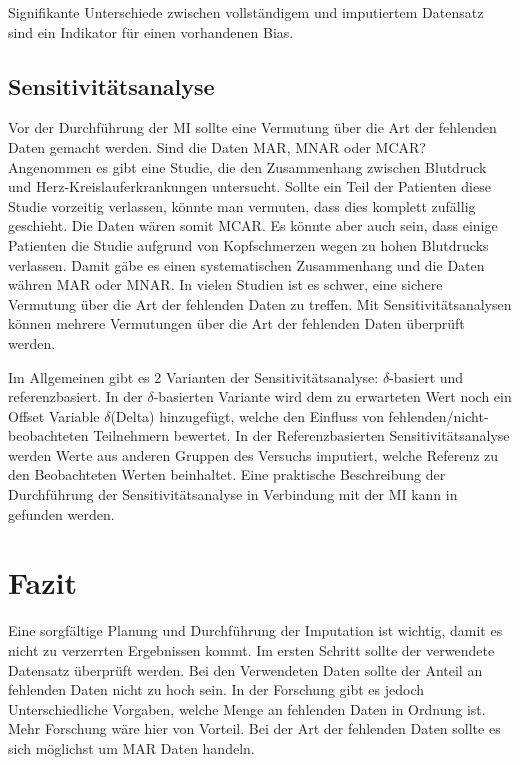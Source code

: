 Signifikante Unterschiede zwischen vollständigem und imputiertem Datensatz sind ein Indikator für einen vorhandenen Bias.

\subsection{Sensitivitätsanalyse}

Vor der Durchführung der MI sollte eine Vermutung über die Art der fehlenden Daten gemacht werden. Sind die Daten MAR, MNAR 
oder MCAR? Angenommen es gibt eine Studie, die den Zusammenhang zwischen Blutdruck und Herz-Kreislauferkrankungen untersucht. 
Sollte ein Teil der Patienten diese Studie vorzeitig verlassen, könnte man vermuten, dass dies komplett zufällig geschieht. 
Die Daten wären somit MCAR. Es könnte aber auch sein, dass einige Patienten die Studie aufgrund von Kopfschmerzen wegen zu 
hohen Blutdrucks verlassen. Damit gäbe es einen systematischen Zusammenhang und die Daten währen MAR oder MNAR. In vielen 
Studien ist es schwer, eine sichere Vermutung über die Art der fehlenden Daten zu treffen. Mit Sensitivitätsanalysen können 
mehrere Vermutungen über die Art der fehlenden Daten überprüft werden. \autocite[2815]{Cro2020}

Im Allgemeinen gibt es 2 Varianten der Sensitivitätsanalyse: $\delta$-basiert und referenzbasiert. In der $\delta$-basierten Variante 
wird dem zu erwarteten Wert noch ein Offset Variable $\delta$(Delta) hinzugefügt, welche den Einfluss von 
fehlenden/nicht-beobachteten Teilnehmern bewertet.  In der Referenzbasierten Sensitivitätsanalyse werden Werte aus 
anderen Gruppen des Versuchs imputiert, welche Referenz zu den Beobachteten Werten beinhaltet. \autocite[2815]{Cro2020} 
Eine praktische Beschreibung der Durchführung der Sensitivitätsanalyse in Verbindung mit der MI kann in 
\textcite[]{Cro2020} gefunden werden.

\section{Fazit}

Eine sorgfältige Planung und Durchführung der Imputation ist wichtig, damit es nicht zu verzerrten Ergebnissen kommt. 
Im ersten Schritt sollte der verwendete Datensatz überprüft werden. Bei den Verwendeten Daten sollte der Anteil an fehlenden 
Daten nicht zu hoch sein. In der Forschung gibt es jedoch Unterschiedliche Vorgaben, welche Menge an fehlenden Daten in 
Ordnung ist. Mehr Forschung wäre hier von Vorteil. Bei der Art der fehlenden Daten sollte es sich möglichst um MAR Daten 
handeln. 

